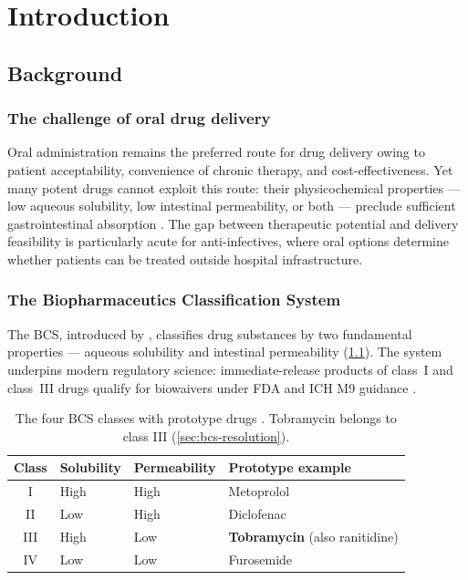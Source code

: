 \chapter{Introduction}
\label{chap:introduction}

\section{Background}

\subsection{The challenge of oral drug delivery}
Oral administration remains the preferred route for drug delivery owing to patient acceptability, convenience of chronic therapy, and cost-effectiveness. Yet many potent drugs cannot exploit this route: their physicochemical properties --- low aqueous solubility, low intestinal permeability, or both --- preclude sufficient gastrointestinal absorption \citep{Amidon1995}. The gap between therapeutic potential and delivery feasibility is particularly acute for anti-infectives, where oral options determine whether patients can be treated outside hospital infrastructure.

\subsection{The Biopharmaceutics Classification System}
The BCS, introduced by \citet{Amidon1995}, classifies drug substances by two fundamental properties --- aqueous solubility and intestinal permeability (\cref{tab:bcs-classes}). The system underpins modern regulatory science: immediate-release products of class~I and class~III drugs qualify for biowaivers under FDA and ICH M9 guidance \citep{FDA2021, ICH2019}.

\begin{table}[htbp]
\centering
\caption{The four BCS classes with prototype drugs \citep{Amidon1995}. Tobramycin belongs to class III (\cref{sec:bcs-resolution}).}
\label{tab:bcs-classes}
\begin{tabular}{clll}
\toprule
Class & Solubility & Permeability & Prototype example\\
\midrule
I   & High & High & Metoprolol\\
II  & Low  & High & Diclofenac\\
\rowcolor{tobblue!12}
III & High & Low  & \textbf{Tobramycin} (also ranitidine)\\
IV  & Low  & Low  & Furosemide\\
\bottomrule
\end{tabular}
\end{table}

